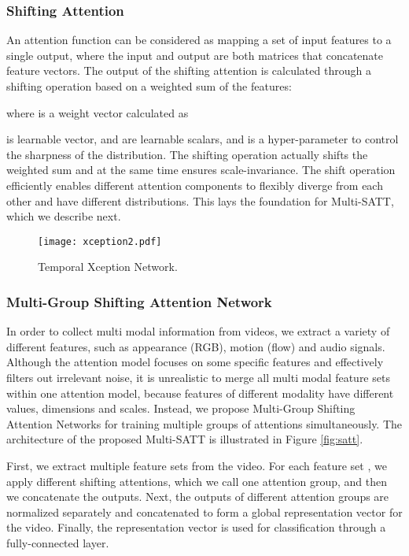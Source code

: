 \documentclass[10pt,twocolumn,letterpaper]{article}
\begin{document}
\subsubsection{Shifting Attention}
An attention function can be considered as mapping a set of input features to a single output, where the input and output are both matrices that concatenate feature vectors. The output of the shifting attention  is calculated through a shifting operation based on a weighted sum of the features:


where  is a weight vector calculated as


 is learnable vector,  and  are learnable scalars, and  is a hyper-parameter to control the sharpness of the distribution. The shifting operation actually shifts the weighted sum and at the same time ensures scale-invariance. The shift operation efficiently enables different attention components to flexibly diverge from each other and have different distributions. This lays the foundation for Multi-SATT, which we describe next.

\begin{figure*}[t!]
    \centering
    \texttt{[image: xception2.pdf]}\\
    \caption{Temporal Xception Network.}
    \label{fig:xception}
\end{figure*}

\subsubsection{Multi-Group Shifting Attention Network}
In order to collect multi modal information from videos, we extract a variety of different features, such as appearance (RGB), motion (flow) and audio signals. Although the attention model focuses on some specific features and effectively filters out irrelevant noise, it is unrealistic to merge all multi modal feature sets within one attention model, because features of different modality have different values, dimensions and scales.
Instead, we propose Multi-Group Shifting Attention Networks for training multiple groups of attentions simultaneously.
The architecture of the proposed Multi-SATT is illustrated in Figure \ref{fig:satt}.

First, we extract multiple feature sets from the video. For each feature set , we apply  different shifting attentions, which we call one attention group, and then we concatenate the outputs. Next, the outputs of different attention groups are normalized separately and concatenated to form a global representation vector for the video. Finally, the representation vector is used for classification through a fully-connected layer.
\end{document}
